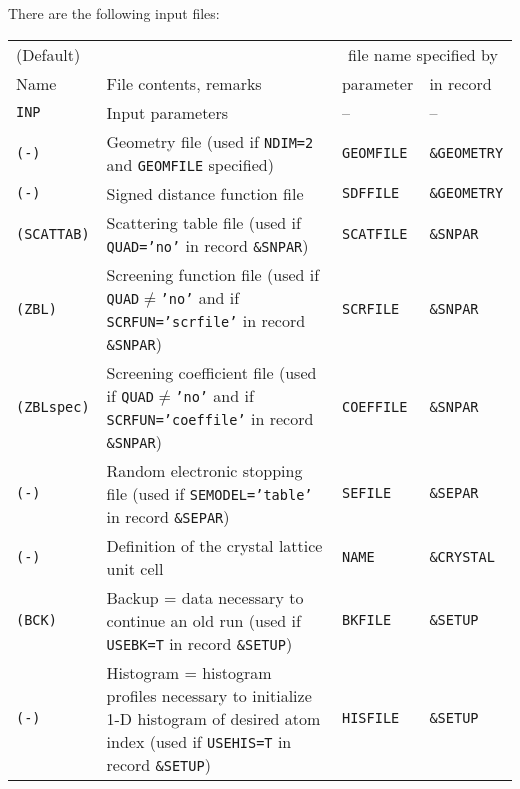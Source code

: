 There are the following input files:
\bigskip
%
\begin{center}
\begin{tabular}{|l|p{}|l|l|}
\hline
(Default) &                   & \multicolumn{2}{c|}{file name specified by} \\
Name      & File contents, remarks     & parameter  & in record \\
\hline
\tt INP         & Input parameters                         & --           & -- \\
\tt (-)         & \raggedright Geometry file (used if \texttt{NDIM=2} and
\texttt{GEOMFILE} specified) & \texttt{GEOMFILE} & \tt \&GEOMETRY \\ 
\tt (-)         & Signed distance function file            & \tt SDFFILE  & \tt \&GEOMETRY \\
\tt (SCATTAB)   & \raggedright Scattering table file (used if \texttt{QUAD='no'} in record 
                  \texttt{\&SNPAR})                        & \tt SCATFILE & \tt \&SNPAR \\
\tt (ZBL)       & \raggedright Screening function file (used if 
                  \texttt{QUAD$\ne$'no'} and if \texttt{SCRFUN='scrfile'} in record 
                  \texttt{\&SNPAR})                        & \tt SCRFILE  & \tt \&SNPAR \\
\tt (ZBLspec)   & \raggedright Screening coefficient file (used if \texttt{QUAD$\ne$'no'} and 
                  if \texttt{SCRFUN='coeffile'} in record \texttt{\&SNPAR})
                                                           & \tt COEFFILE & \tt \&SNPAR \\
\tt (-)         & Random electronic stopping file (used if \texttt{SEMODEL='table'} in
                  record \texttt{\&SEPAR})                 & \tt SEFILE   & \tt \&SEPAR \\
\tt (-)         & Definition of the crystal lattice unit cell  
                                                           & \tt NAME     & \tt \&CRYSTAL \\
\tt (BCK)       & Backup = data necessary to continue an old run (used if \texttt{USEBK=T} in 
                  record \texttt{\&SETUP})                 & \tt BKFILE   & \tt \&SETUP \\
\tt (-)         & Histogram = histogram profiles necessary to initialize 1-D
                  histogram of desired atom index (used if \texttt{USEHIS=T} in
                  record \texttt{\&SETUP})                 & \tt HISFILE  & \tt \&SETUP \\

\end{tabular}
\end{center}
